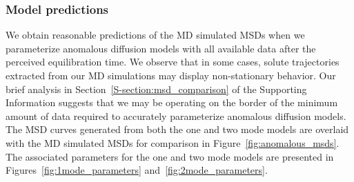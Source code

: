 \documentclass[journal=jctcce,manuscript=article]{achemso}
\begin{document}
%
%  

  \subsubsection{Model predictions}\label{section:AD_all_data}
  
  We obtain reasonable predictions of the MD simulated MSDs when we
  parameterize anomalous diffusion models with all available data after 
  the perceived equilibration time.
  We observe that in some cases, solute trajectories extracted from our MD
  simulations may display non-stationary behavior. Our brief analysis 
  in Section~\ref{S-section:msd_comparison} of the Supporting Information 
  suggests that we may be operating on the border of the minimum amount of
  data required to accurately parameterize anomalous diffusion models.
  The MSD curves generated from both the one and two mode models are overlaid
  with the MD simulated MSDs for comparison in Figure~\ref{fig:anomalous_msds}.
  The associated parameters for the one and two mode models are presented in
  Figures~\ref{fig:1mode_parameters} and~\ref{fig:2mode_parameters}.
  
\end{document}
